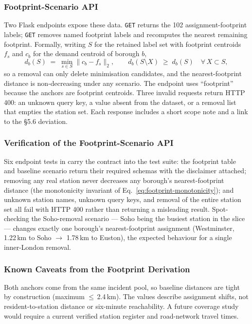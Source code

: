 \subsubsection{Footprint-Scenario API}
Two Flask endpoints expose these data. \texttt{GET}  returns the 102 assignment-footprint labels; \texttt{GET}  removes named footprint labels and recomputes the nearest remaining footprint. Formally, writing $S$ for the retained label set with footprint centroids $f_s$ and $c_b$ for the demand centroid of borough $b$,
\begin{equation}
d_b(S) \;=\; \min_{s \in S} \bigl\| c_b - f_s \bigr\|_2,
\qquad
d_b(S \setminus X) \;\ge\; d_b(S) \quad \forall\, X \subset S,
\label{eq:footprint-monotonicity}
\end{equation}
so a removal can only delete minimisation candidates, and the nearest-footprint distance is non-decreasing under any scenario. The endpoint uses ``footprint'' because the anchors are footprint centroids. Three invalid requests return HTTP 400: an unknown query key, a  value absent from the dataset, or a removal list that empties the station set. Each response includes a short scope note and a link to the \S5.6 deviation.

\subsubsection{Verification of the Footprint-Scenario API}
Six endpoint tests in  carry the contract into the test suite: the footprint table and baseline scenario return their required schemas with the disclaimer attached; removing any real station never decreases any borough's nearest-footprint distance (the monotonicity invariant of Eq.~\ref{eq:footprint-monotonicity}); and unknown station names, unknown query keys, and removal of the entire station set all fail with HTTP 400 rather than returning a misleading result. Spot-checking the Soho-removal scenario --- Soho being the busiest station in the slice --- changes exactly one borough's nearest-footprint assignment (Westminster, 1.22\,km to Soho $\to$ 1.78\,km to Euston), the expected behaviour for a single inner-London removal.

\subsubsection{Known Caveats from the Footprint Derivation}
Both anchors come from the same incident pool, so baseline distances are tight by construction (maximum $\leq$\,2.4\,km). The values describe assignment shifts, not resident-to-station distance or six-minute reachability. A future coverage study would require a current verified station register and road-network travel times.

